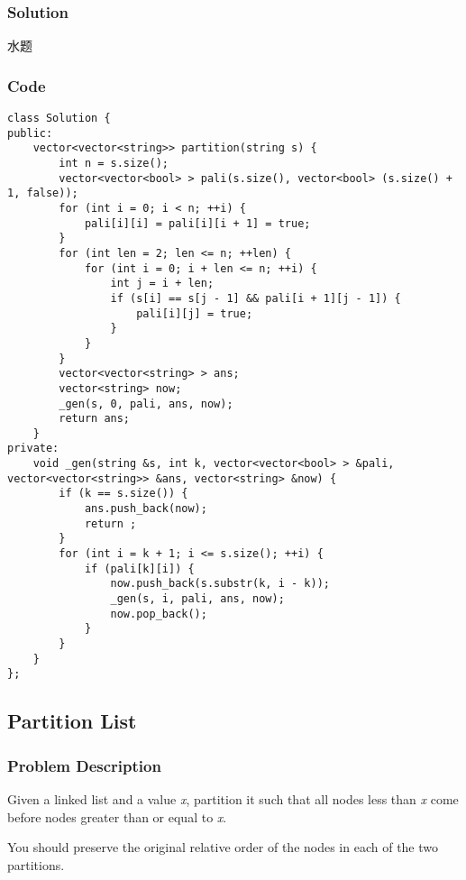 \documentclass{article}
\begin{document}
\begin{CJK*}{UTF8}{gkai}

\subsubsection*{Solution}
水题

\subsubsection*{Code}
\begin{lstlisting}
class Solution {
public:
    vector<vector<string>> partition(string s) {
        int n = s.size();
        vector<vector<bool> > pali(s.size(), vector<bool> (s.size() + 1, false));
        for (int i = 0; i < n; ++i) {
            pali[i][i] = pali[i][i + 1] = true;
        }
        for (int len = 2; len <= n; ++len) {
            for (int i = 0; i + len <= n; ++i) {
                int j = i + len;
                if (s[i] == s[j - 1] && pali[i + 1][j - 1]) {
                    pali[i][j] = true;
                }
            }
        }
        vector<vector<string> > ans;
        vector<string> now;
        _gen(s, 0, pali, ans, now);
        return ans;
    }
private:
    void _gen(string &s, int k, vector<vector<bool> > &pali, vector<vector<string>> &ans, vector<string> &now) {
        if (k == s.size()) {
            ans.push_back(now);
            return ;
        }
        for (int i = k + 1; i <= s.size(); ++i) {
            if (pali[k][i]) {
                now.push_back(s.substr(k, i - k));
                _gen(s, i, pali, ans, now);
                now.pop_back();
            }
        }
    }
}; 
\end{lstlisting}


\subsection{ Partition List }
\label{ Partition List }

\subsubsection*{Problem Description}
Given a linked list and a value \emph{x}, partition it such that all nodes less than \emph{x} come before nodes greater than or equal to \emph{x}.

You should preserve the original relative order of the nodes in each of the two partitions.


\end{CJK*}
\end{document}
